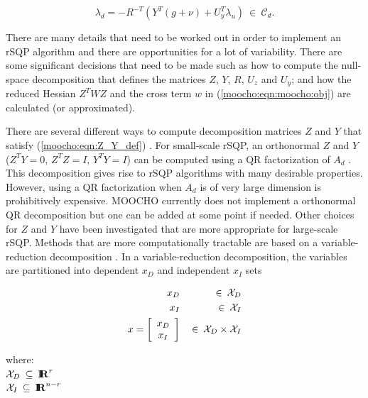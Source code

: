 \documentclass[pdf,12pt,report]{SANDreport}
\begin{document}
{\bsinglespace
\begin{equation}
\lambda_d = - R^{-T} \left( Y^T(g + \nu) + U_y^T \lambda_u \right)
    \:\in\:\mathcal{C}_d.
\label{moocho:eqn:lambda_d}
\end{equation}
\esinglespace}

There are many details that need to be worked out in order to implement an
rSQP algorithm and there are opportunities for a lot of variability.  There
are some significant decisions that need to be made such as how to compute the
null-space decomposition that defines the matrices $Z$, $Y$, $R$, $U_z$ and
$U_y$; and how the reduced Hessian $Z^T W Z$ and the cross term $w$ in
(\ref{moocho:eqn:moocho:obj}) are calculated (or approximated).

There are several different ways to compute decomposition matrices $Z$ and $Y$
that satisfy (\ref{moocho:eqn:Z_Y_def}) {}\cite{ref:schmid_accel_1993}.  For
small-scale rSQP, an orthonormal $Z$ and $Y$ ($Z^T Y = 0$, $Z^T Z = I$, $Y^T Y
= I$) can be computed using a QR factorization of $A_d$
{}\cite{ref:nocedal_overton_1985}.  This decomposition gives rise to rSQP
algorithms with many desirable properties.  However, using a QR factorization
when $A_d$ is of very large dimension is prohibitively expensive.  MOOCHO
currently does not implement a orthonormal QR decomposition but one can be
added at some point if needed.  Other choices for $Z$ and $Y$ have been
investigated that are more appropriate for large-scale rSQP.  Methods that are
more computationally tractable are based on a variable-reduction decomposition
{}\cite{ref:schmid_accel_1993}.  In a variable-reduction decomposition, the
variables are partitioned into dependent $x_D$ and independent $x_I$ sets

{\bsinglespace
\begin{eqnarray}
x_D & & \:\in\:\mathcal{X}_D \\
x_I & & \:\in\:\mathcal{X}_I \\
x = {\bmat{c} x_D \\ x_I \emat} & & \:\in\: \mathcal{X}_D \times \mathcal{X}_I
\label{moocho:eqn:x_D_I} \\
\end{eqnarray}
\begin{tabbing}
\hspace{4ex}where:\hspace{5ex}\= \\
\>	$\mathcal{X}_D\:\subseteq\:\RE^{r}$\\
\>	$\mathcal{X}_I\:\subseteq\:\RE^{n-r}$
\end{tabbing}
\esinglespace}
\end{document}
